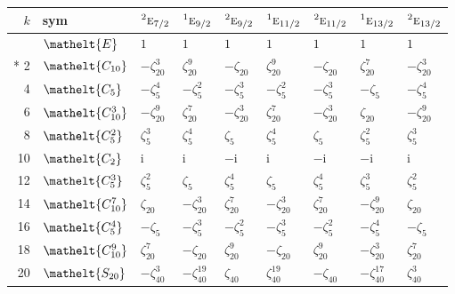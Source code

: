 \documentclass[10pt,a4paper]{article}
\numberwithin{equation}{section}
\newcommand{\eltfont}[1]{{\let\sigma\eltsigma\mathelt{#1}}}
\newcommand{\irr}[1]{\text{\normalfont\scshape #1}}
\newcommand{\conjpair}[1]{{}^{#1}}
\newcommand{\cls}[1]{\eltfont{#1}}
\newcommand{\iunit}{\mathrm{i}}
\newcommand{\rootunity}[1]{\zeta_{#1}}
\begin{document}
{\small\setlength{\tabcolsep}{4pt}
\begin{longtable}{@{}rllllllll@{}}\toprule
$k$ & sym & $\conjpair{2}\irr{e}_{7/2}$ & $\conjpair{1}\irr{e}_{9/2}$ & $\conjpair{2}\irr{e}_{9/2}$ & $\conjpair{1}\irr{e}_{11/2}$ & $\conjpair{2}\irr{e}_{11/2}$ & $\conjpair{1}\irr{e}_{13/2}$ & $\conjpair{2}\irr{e}_{13/2}$\\\midrule\endhead
\bottomrule\endfoot\endlastfoot
0 & $\cls{E}$ & $1$ & $1$ & $1$ & $1$ & $1$ & $1$ & $1$\\*
2 & $\cls{C_{10}}$ & $-\rootunity{20}^{3}$ & $\rootunity{20}^{9}$ & $-\rootunity{20}$ & $\rootunity{20}^{9}$ & $-\rootunity{20}$ & $\rootunity{20}^{7}$ & $-\rootunity{20}^{3}$\\
4 & $\cls{C_{5}}$ & $-\rootunity{5}^{4}$ & $-\rootunity{5}^{2}$ & $-\rootunity{5}^{3}$ & $-\rootunity{5}^{2}$ & $-\rootunity{5}^{3}$ & $-\rootunity{5}$ & $-\rootunity{5}^{4}$\\
6 & $\cls{C_{10}^{3}}$ & $-\rootunity{20}^{9}$ & $\rootunity{20}^{7}$ & $-\rootunity{20}^{3}$ & $\rootunity{20}^{7}$ & $-\rootunity{20}^{3}$ & $\rootunity{20}$ & $-\rootunity{20}^{9}$\\
8 & $\cls{C_{5}^{2}}$ & $\rootunity{5}^{3}$ & $\rootunity{5}^{4}$ & $\rootunity{5}$ & $\rootunity{5}^{4}$ & $\rootunity{5}$ & $\rootunity{5}^{2}$ & $\rootunity{5}^{3}$\\
10 & $\cls{C_{2}}$ & $\iunit{}$ & $\iunit{}$ & $-\iunit{}$ & $\iunit{}$ & $-\iunit{}$ & $-\iunit{}$ & $\iunit{}$\\
12 & $\cls{C_{5}^{3}}$ & $\rootunity{5}^{2}$ & $\rootunity{5}$ & $\rootunity{5}^{4}$ & $\rootunity{5}$ & $\rootunity{5}^{4}$ & $\rootunity{5}^{3}$ & $\rootunity{5}^{2}$\\
14 & $\cls{C_{10}^{7}}$ & $\rootunity{20}$ & $-\rootunity{20}^{3}$ & $\rootunity{20}^{7}$ & $-\rootunity{20}^{3}$ & $\rootunity{20}^{7}$ & $-\rootunity{20}^{9}$ & $\rootunity{20}$\\
16 & $\cls{C_{5}^{4}}$ & $-\rootunity{5}$ & $-\rootunity{5}^{3}$ & $-\rootunity{5}^{2}$ & $-\rootunity{5}^{3}$ & $-\rootunity{5}^{2}$ & $-\rootunity{5}^{4}$ & $-\rootunity{5}$\\
18 & $\cls{C_{10}^{9}}$ & $\rootunity{20}^{7}$ & $-\rootunity{20}$ & $\rootunity{20}^{9}$ & $-\rootunity{20}$ & $\rootunity{20}^{9}$ & $-\rootunity{20}^{3}$ & $\rootunity{20}^{7}$\\
20 & $\cls{S_{20}}$ & $-\rootunity{40}^{3}$ & $-\rootunity{40}^{19}$ & $\rootunity{40}$ & $\rootunity{40}^{19}$ & $-\rootunity{40}$ & $-\rootunity{40}^{17}$ & $\rootunity{40}^{3}$\\

\end{longtable}}
\end{document}
